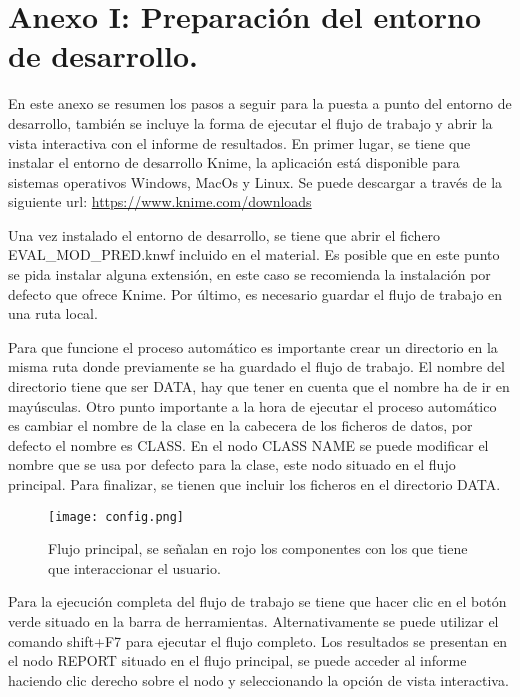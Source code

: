 \section{Anexo I: Preparación del entorno de desarrollo.}

En este anexo se resumen los pasos a seguir para la puesta a punto del entorno de desarrollo, también se incluye la forma de ejecutar el flujo de trabajo y abrir la vista interactiva con el informe de resultados. En primer lugar, se tiene que instalar el entorno de desarrollo Knime, la aplicación está disponible para sistemas operativos Windows, MacOs y Linux. Se puede descargar a través de la siguiente url: \url{https://www.knime.com/downloads}

\bigbreak

Una vez instalado el entorno de desarrollo, se tiene que abrir el fichero EVAL\_MOD\_PRED.knwf incluido en el material. Es posible que en este punto se pida instalar alguna extensión, en este caso se recomienda la instalación por defecto que ofrece Knime. Por último, es necesario guardar el flujo de trabajo en una ruta local.

\bigbreak

Para que funcione el proceso automático es importante crear un directorio en la misma ruta donde previamente se ha guardado el flujo de trabajo. El nombre del directorio tiene que ser DATA, hay que tener en cuenta que el nombre ha de ir en mayúsculas. Otro punto importante a la hora de ejecutar el proceso automático es cambiar el nombre de la clase en la cabecera de los ficheros de datos, por defecto el nombre es CLASS. En el nodo CLASS NAME se puede modificar el nombre que se usa por defecto para la clase, este nodo situado en el flujo principal. Para finalizar, se tienen que incluir los ficheros en el directorio DATA.

\bigbreak

\begin{figure}[htp]
    \centering
    \texttt{[image: config.png]}
    \caption{Flujo principal, se señalan en rojo los componentes con los que tiene que interaccionar el usuario.}
    \label{fig:4}
\end{figure}

\bigbreak

Para la ejecución completa del flujo de trabajo se tiene que hacer clic en el botón verde situado en la barra de herramientas. Alternativamente se puede utilizar el comando shift+F7 para ejecutar el flujo completo. Los resultados se presentan en el nodo REPORT situado en el flujo principal, se puede acceder al informe haciendo clic derecho sobre el nodo y seleccionando la opción de vista interactiva.

\clearpage